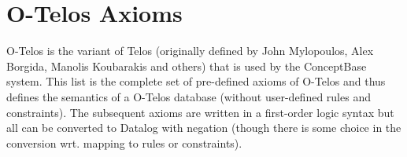 
\chapter{O-Telos Axioms}
\label{cha:otelos-axioms}

O-Telos is the variant of Telos (originally defined by John Mylopoulos,
Alex Borgida, Manolis Koubarakis and others) that is used by the
ConceptBase system.
This list is the complete set of pre-defined axioms of O-Telos
and thus defines the semantics of a O-Telos database (without user-defined
rules and constraints).
The subsequent axioms are written in a first-order logic syntax but all
can be converted to Datalog with negation (though there is some choice
in the conversion wrt. mapping to rules or constraints).



\begin{itemize}


\end{itemize}
